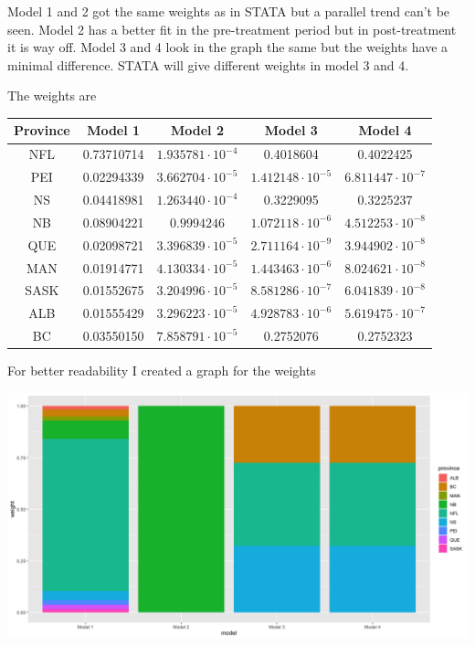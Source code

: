 \documentclass{article}
\begin{document}
	Model 1 and 2 got the same weights as in STATA but a parallel trend can't be seen. Model 2 has a better fit in the pre-treatment period but in post-treatment it is way off. Model 3 and 4 look in the graph the same but the weights have a minimal difference. STATA will give different weights in model 3 and 4.
	
	The weights are
	\begin{center}
		\begin{tabular}{c|c|c|c|c}
			\textbf{Province} & \textbf{Model 1} & \textbf{Model 2} & \textbf{Model 3} & \textbf{Model 4} \\
			\hline
			 NFL & 0.73710714 & $1.935781\cdot 10^{-4}$ & 0.4018604 & 0.4022425 \\			
			 PEI & 0.02294339 & $3.662704\cdot 10^{-5}$ & $1.412148\cdot 10^{-5}$ & $6.811447\cdot 10^{-7}$ \\
			 NS & 0.04418981 & $1.263440\cdot 10^{-4}$ & 0.3229095 & 0.3225237 \\
			 NB & 0.08904221 & $0.9994246$ & $1.072118\cdot 10^{-6}$ & $4.512253\cdot 10^{-8}$ \\
			 QUE & 0.02098721 & $3.396839\cdot 10^{-5}$ & $2.711164\cdot 10^{-9}$ & $3.944902\cdot 10^{-8}$ \\
			 MAN & 0.01914771 & $4.130334\cdot 10^{-5}$ & $1.443463\cdot 10^{-6}$ & $8.024621\cdot 10^{-8}$ \\
			 SASK & 0.01552675 & $3.204996\cdot 10^{-5}$ & $8.581286\cdot 10^{-7}$ & $6.041839\cdot 10^{-8}$ \\
			 ALB & 0.01555429 & $3.296223\cdot 10^{-5}$ & $4.928783\cdot 10^{-6}$ & $5.619475\cdot 10^{-7}$ \\
			 BC & 0.03550150 & $7.858791\cdot 10^{-5}$ & 0.2752076 & 0.2752323 \\
		\end{tabular}
	\end{center}
	For better readability I created a graph for the weights
	\begin{center}
		\includegraphics[scale=0.35]{weights}
	\end{center}
\end{document}
